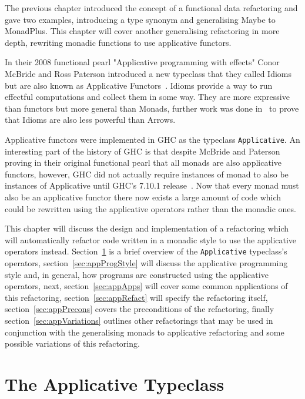 The previous chapter introduced the concept of a functional data refactoring and gave two examples, introducing a type synonym and generalising Maybe to MonadPlus. This chapter will cover another generalising refactoring in more depth, rewriting monadic functions to use applicative functors. 

In their 2008 functional pearl "Applicative programming with effects" Conor McBride and Ross Paterson introduced a new typeclass that they called Idioms but are also known as Applicative Functors~\citep{mcbrideIdioms}. Idioms provide a way to run effectful computations and collect them in some way. They are more expressive than functors but more general than Monads, further work was done in~\citep{arrowsAndIdioms} to prove that Idioms are also less powerful than Arrows.

Applicative functors were implemented in GHC as the typeclass \texttt{Applicative}. An interesting part of the history of GHC is that despite McBride and Paterson proving in their original functional pearl that all monads are also applicative functors, however,  GHC did not actually require instances of monad to also be instances of Applicative until GHC's 7.10.1 release~\citep{ghc7.10Release}. Now that every monad must also be an applicative functor there now exists a large amount of code which could be rewritten using the applicative operators rather than the monadic ones. 

This chapter will discuss the design and implementation of a refactoring which will automatically refactor code written in a monadic style to use the applicative operators instead. Section~\ref{sec:appOverview} is a brief overview of the \texttt{Applicative} typeclass's operators, section~\ref{sec:appProgStyle} will discuss the applicative programming style and, in general, how programs are constructed using the applicative operators, next, section~\ref{sec:appApps} will cover some common applications of this refactoring, section~\ref{sec:appRefact} will specify the refactoring itself, section~\ref{sec:appPrecons} covers the preconditions of the refactoring, finally section~\ref{sec:appVariations} outlines other refactorings that may be used in conjunction with the generalising monads to applicative refactoring and some possible variations of this refactoring. 

\section{The Applicative Typeclass}
\label{sec:appOverview}

